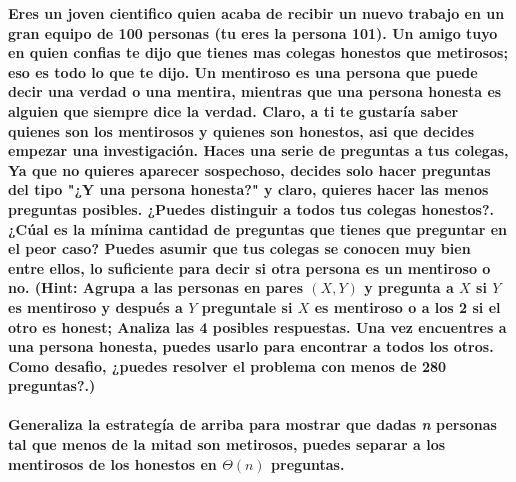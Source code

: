 \textbf{Eres un joven cientifico quien acaba de recibir un nuevo trabajo
en un gran equipo de 100 personas (tu eres la persona 101). Un amigo tuyo
en quien confias te dijo que tienes mas colegas honestos que metirosos;
eso es todo lo que te dijo. Un mentiroso es una persona que puede decir
 una verdad o una mentira, mientras que una persona honesta es alguien 
 que siempre dice la verdad. Claro, a ti te gustaría saber quienes son
 los mentirosos y quienes son honestos, asi que decides empezar una 
 investigación. Haces una serie de preguntas a tus colegas, Ya que no
 quieres aparecer sospechoso, decides solo hacer preguntas del tipo 
 "¿Y una persona honesta?" y claro, quieres hacer las menos preguntas 
 posibles. ¿Puedes distinguir a todos tus colegas honestos?. ¿Cúal es la
 mínima cantidad de preguntas que tienes que preguntar en el peor caso? 
 Puedes asumir que tus colegas se conocen muy bien entre ellos, lo
 suficiente para decir si otra persona es un mentiroso o no. (Hint: 
 Agrupa a las personas en pares $(X,Y)$ y pregunta a $X$ si $Y$ es mentiroso
 y después a $Y$ preguntale si $X$ es mentiroso o a los 2 si el otro es
 honest; Analiza las 4 posibles respuestas. Una vez encuentres a una persona
 honesta, puedes usarlo para encontrar a todos los otros. Como desafio, ¿puedes
 resolver el problema con menos de 280 preguntas?.)\\\\
 Generaliza la estrategía de arriba para mostrar que dadas \textit{n} personas
 tal que menos de la mitad son metirosos, puedes separar a los mentirosos de los
 honestos en $\Theta (n)$ preguntas.}\\